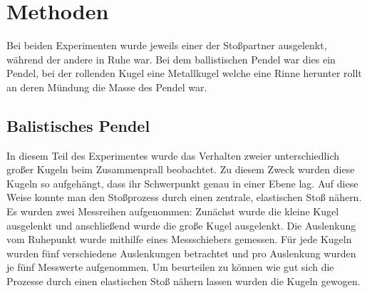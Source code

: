\section{Methoden}

Bei beiden Experimenten wurde jeweils einer der Stoßpartner ausgelenkt, während der andere in Ruhe war. Bei dem ballistischen Pendel war dies ein Pendel, bei der rollenden Kugel eine Metallkugel welche eine Rinne herunter rollt an deren Mündung die Masse des Pendel war.

\subsection*{Balistisches Pendel}
In diesem Teil des Experimentes wurde das Verhalten zweier unterschiedlich großer Kugeln beim Zusammenprall beobachtet.
Zu diesem Zweck wurden diese Kugeln so aufgehängt, dass ihr Schwerpunkt genau in einer Ebene lag.
Auf diese Weise konnte man den Stoßprozess durch einen zentrale, elastischen Stoß nähern.
Es wurden zwei Messreihen aufgenommen: Zunächst wurde die kleine Kugel ausgelenkt und anschließend wurde die große Kugel ausgelenkt. Die Auslenkung vom Ruhepunkt wurde mithilfe eines Messschiebers gemessen.
Für jede Kugeln wurden fünf verschiedene Auslenkungen betrachtet und pro Auslenkung wurden je fünf Messwerte aufgenommen.
Um beurteilen zu können wie gut sich die Prozesse durch einen elastischen Stoß nähern lassen wurden die Kugeln gewogen.

